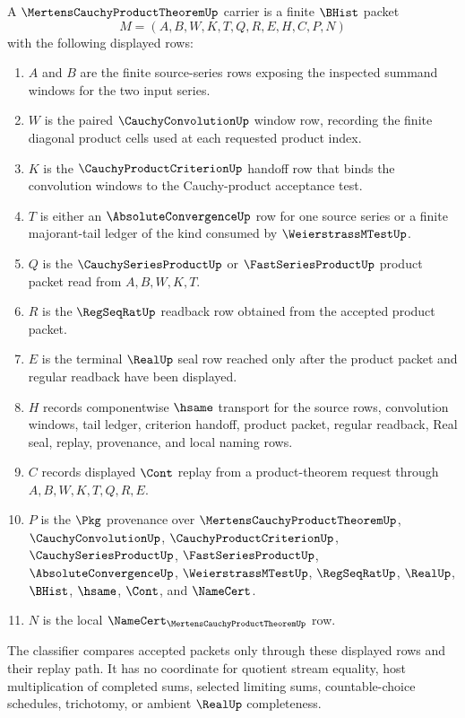 \begin{definition}
\label{def:mertens-cauchy-product-theorem-carrier}
A $\MertensCauchyProductTheoremUp$ carrier is a finite $\BHist$ packet
$$
M=(A,B,W,K,T,Q,R,E,H,C,P,N)
$$
with the following displayed rows:
\begin{enumerate}
\item $A$ and $B$ are the finite source-series rows exposing the inspected summand windows for the two input series.
\item $W$ is the paired $\CauchyConvolutionUp$ window row, recording the finite diagonal product cells used at each requested product index.
\item $K$ is the $\CauchyProductCriterionUp$ handoff row that binds the convolution windows to the Cauchy-product acceptance test.
\item $T$ is either an $\AbsoluteConvergenceUp$ row for one source series or a finite majorant-tail ledger of the kind consumed by $\WeierstrassMTestUp$.
\item $Q$ is the $\CauchySeriesProductUp$ or $\FastSeriesProductUp$ product packet read from $A,B,W,K,T$.
\item $R$ is the $\RegSeqRatUp$ readback row obtained from the accepted product packet.
\item $E$ is the terminal $\RealUp$ seal row reached only after the product packet and regular readback have been displayed.
\item $H$ records componentwise $\hsame$ transport for the source rows, convolution windows, tail ledger, criterion handoff, product packet, regular readback, Real seal, replay, provenance, and local naming rows.
\item $C$ records displayed $\Cont$ replay from a product-theorem request through $A,B,W,K,T,Q,R,E$.
\item $P$ is the $\Pkg$ provenance over $\MertensCauchyProductTheoremUp$, $\CauchyConvolutionUp$, $\CauchyProductCriterionUp$, $\CauchySeriesProductUp$, $\FastSeriesProductUp$, $\AbsoluteConvergenceUp$, $\WeierstrassMTestUp$, $\RegSeqRatUp$, $\RealUp$, $\BHist$, $\hsame$, $\Cont$, and $\NameCert$.
\item $N$ is the local $\NameCert_{\MertensCauchyProductTheoremUp}$ row.
\end{enumerate}
The classifier compares accepted packets only through these displayed rows and their replay path. It has no coordinate for quotient stream equality, host multiplication of completed sums, selected limiting sums, countable-choice schedules, trichotomy, or ambient $\RealUp$ completeness.
\end{definition}

